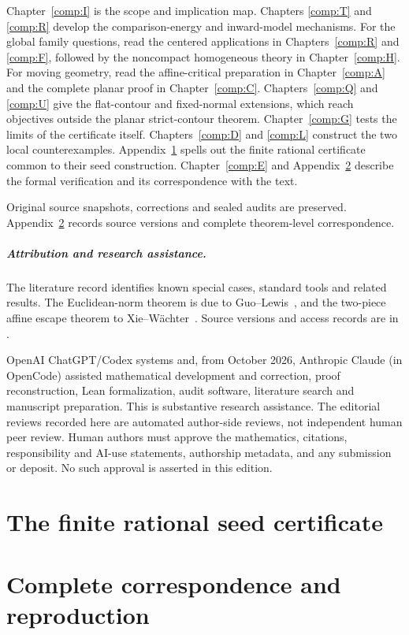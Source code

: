 Chapter~\ref{comp:I} is the scope and implication map. Chapters
\ref{comp:T} and \ref{comp:R} develop the comparison-energy and inward-model
mechanisms. For the global family questions, read the centered applications
in Chapters~\ref{comp:R} and \ref{comp:F}, followed by the noncompact
homogeneous theory in Chapter~\ref{comp:H}. For moving geometry, read the
affine-critical preparation in Chapter~\ref{comp:A} and the complete planar
proof in Chapter~\ref{comp:C}. Chapters~\ref{comp:Q} and \ref{comp:U} give
the flat-contour and fixed-normal extensions, which reach objectives outside
the planar strict-contour theorem. Chapter~\ref{comp:G} tests the limits
of the certificate itself. Chapters~\ref{comp:D} and \ref{comp:L} construct
the two local counterexamples. Appendix~\ref{comp:seed_certificate} spells out the finite
rational certificate common to their seed construction. Chapter~\ref{comp:E}
and Appendix~\ref{comp:correspondence} describe the formal verification and
its correspondence with the text.

Original source snapshots, corrections and sealed audits are preserved.
Appendix~\ref{comp:correspondence} records source versions and complete
theorem-level correspondence.

\paragraph{Attribution and research assistance.}
The literature record identifies known special cases, standard tools and
related results. The Euclidean-norm theorem is due to Guo--Lewis~\cite{GL18},
and the two-piece affine escape theorem to Xie--W\"achter~\cite{XW}. Source
versions and access records are in .

OpenAI ChatGPT/Codex systems and, from October 2026, Anthropic Claude (in
OpenCode) assisted mathematical development and correction,
proof reconstruction, Lean formalization, audit software, literature search
and manuscript preparation. This is substantive research assistance. The
editorial reviews recorded here are automated author-side reviews, not
independent human peer review. Human authors must approve the mathematics,
citations, responsibility and AI-use statements, authorship metadata, and any
submission or deposit. No such approval is asserted in this edition.
\tableofcontents
\mainmatter

\appendix
\renewcommand{\ModuleTag}{A}
\chapter{The finite rational seed certificate}\label{comp:seed_certificate}

\renewcommand{\ModuleTag}{B}
\chapter{Complete correspondence and reproduction}\label{comp:correspondence}

\backmatter


